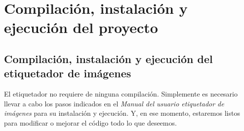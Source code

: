 \section{Compilación, instalación y ejecución del proyecto}

\subsection{Compilación, instalación y ejecución del  etiquetador de imágenes}
El etiquetador no requiere de ninguna compilación. Simplemente es necesario llevar a cabo los pasos indicados en el \textit{\textit{Manual del usuario etiquetador de imágenes}} para su instalación y ejecución. Y, en ese momento, estaremos listos para modificar o mejorar el código todo lo que deseemos.

\begin{comment}
\section{Pruebas del sistema}
\end{comment}